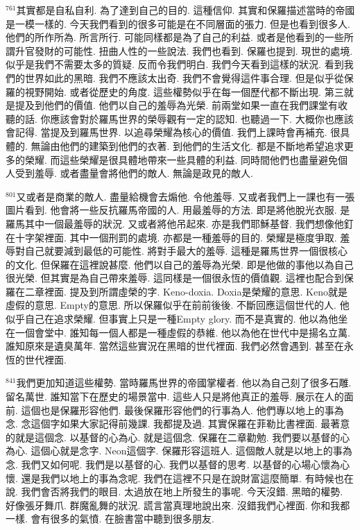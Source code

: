 \documentclass{book}
\begin{document}
$^{761}$其實都是自私自利.
為了達到自己的目的.
這種信仰.
其實和保羅描述當時的帝國是一模一樣的.
今天我們看到的很多可能是在不同層面的張力.
但是也看到很多人.
他們的所作所為.
所言所行.
可能同樣都是為了自己的利益.
或者是他看到的一些所謂升官發財的可能性.
扭曲人性的一些說法.
我們也看到.
保羅也提到.
現世的處境.
似乎是我們不需要太多的質疑.
反而令我們明白.
我們今天看到這樣的狀況.
看到我們的世界如此的黑暗.
我們不應該太出奇.
我們不會覺得這件事合理.
但是似乎從保羅的視野開始.
或者從歷史的角度.
這些權勢似乎在每一個歷代都不斷出現.
第三就是提及到他們的價值.
他們以自己的羞辱為光榮.
前兩堂如果一直在我們課堂有收聽的話.
你應該會對於羅馬世界的榮辱觀有一定的認知.
也聽過一下.
大概你也應該會記得.
當提及到羅馬世界.
以追尋榮耀為核心的價值.
我們上課時會再補充.
很具體的.
無論由他們的建築到他們的衣著.
到他們的生活文化.
都是不斷地希望追求更多的榮耀.
而這些榮耀是很具體地帶來一些具體的利益.
同時間他們也盡量避免個人受到羞辱.
或者盡量會將他們的敵人.
無論是政見的敵人.

$^{801}$又或者是商業的敵人.
盡量給機會去煽他.
令他羞辱.
又或者我們上一課也有一張圖片看到.
他會將一些反抗羅馬帝國的人.
用最羞辱的方法.
即是將他脫光衣服.
是羅馬其中一個最羞辱的狀況.
又或者將他吊起來.
亦是我們耶穌基督.
我們想像他釘在十字架裡面.
其中一個刑罰的處境.
亦都是一種羞辱的目的.
榮耀是極度爭取.
羞辱對自己就要減到最低的可能性.
將對手最大的羞辱.
這種是羅馬世界一個很核心的文化.
但保羅在這裡說甚麼.
他們以自己的羞辱為光榮.
即是他做的事他以為自己很光榮.
但其實是為自己帶來羞辱.
這同樣是一個很永恆的價值觀.
這裡也配合到保羅在二章裡面.
提及到所謂虛榮的字.
Keno-doxia.
Doxia是榮耀的意思.
Keno就是虛假的意思.
Empty的意思.
所以保羅似乎在前前後後.
不斷回應這個世代的人.
他似乎自己在追求榮耀.
但事實上只是一種Empty glory.
而不是真實的.
他以為他坐在一個會堂中.
誰知每一個人都是一種虛假的恭維.
他以為他在世代中是揚名立萬.
誰知原來是遺臭萬年.
當然這些實況在黑暗的世代裡面.
我們必然會遇到.
甚至在永恆的世代裡面.

$^{841}$我們更加知道這些權勢.
當時羅馬世界的帝國掌權者.
他以為自己刻了很多石雕.
留名萬世.
誰知當下在歷史的場景當中.
這些人只是將他真正的羞辱.
展示在人的面前.
這個也是保羅形容他們.
最後保羅形容他們的行事為人.
他們專以地上的事為念.
念這個字如果大家記得前幾課.
我都提及過.
其實保羅在菲勒比書裡面.
最著意的就是這個念.
以基督的心為心.
就是這個念.
保羅在二章勸勉.
我們要以基督的心為心.
這個心就是念字.
Neon這個字.
保羅形容這班人.
這個敵人就是以地上的事為念.
我們又如何呢.
我們是以基督的心.
我們以基督的思考.
以基督的心場心懷為心懷.
還是我們以地上的事為念呢.
我們在這裡不只是在說財富這麼簡單.
有時候也在說.
我們會否將我們的眼目.
太過放在地上所發生的事呢.
今天沒錯.
黑暗的權勢.
好像張牙舞爪.
群魔亂舞的狀況.
謊言當真理地說出來.
沒錯我們心裡面.
你和我都一樣.
會有很多的氣憤.
在臉書當中聽到很多朋友.
\end{document}
